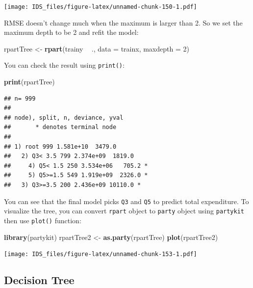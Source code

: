 \documentclass[12pt,]{krantz}
\makeatletter
\newenvironment{Shaded}{\begin{snugshade}}{\end{snugshade}}
\newcommand{\DataTypeTok}[1]{\textcolor[rgb]{0.27,0.27,0.27}{#1}}
\newcommand{\DecValTok}[1]{\textcolor[rgb]{0.06,0.06,0.06}{#1}}
\newcommand{\KeywordTok}[1]{\textcolor[rgb]{0.27,0.27,0.27}{\textbf{#1}}}
\newcommand{\NormalTok}[1]{#1}
\newcommand{\OperatorTok}[1]{\textcolor[rgb]{0.43,0.43,0.43}{\textbf{#1}}}
\newcommand{\StringTok}[1]{\textcolor[rgb]{0.5,0.5,0.5}{#1}}
\newenvironment{kframe}{%
\medskip{}
\setlength{\fboxsep}{.8em}
 \def\at@end@of@kframe{}%
 \ifinner\ifhmode%
  \def\at@end@of@kframe{\end{minipage}}%
  \begin{minipage}{\columnwidth}%
 \fi\fi%
 \def\FrameCommand##1{\hskip\@totalleftmargin \hskip-\fboxsep
 \colorbox{shadecolor}{##1}\hskip-\fboxsep
     \hskip-\linewidth \hskip-\@totalleftmargin \hskip\columnwidth}%
 \MakeFramed {\advance\hsize-\width
   \@totalleftmargin\z@ \linewidth\hsize
   \@setminipage}}%
 {\par\unskip\endMakeFramed%
 \at@end@of@kframe}
\renewenvironment{Shaded}{\begin{kframe}}{\end{kframe}}
\makeatother
\begin{document}
\texttt{[image: IDS\_files/figure-latex/unnamed-chunk-150-1.pdf]}

RMSE doesn't change much when the maximum is larger than 2. So we set the maximum depth to be 2 and refit the model:

\begin{Shaded}
\begin{Highlighting}[]
\NormalTok{rpartTree <-}\StringTok{ }\KeywordTok{rpart}\NormalTok{(trainy }\OperatorTok{~}\StringTok{ }\NormalTok{., }\DataTypeTok{data =}\NormalTok{ trainx, }\DataTypeTok{maxdepth =} \DecValTok{2}\NormalTok{)}
\end{Highlighting}
\end{Shaded}

You can check the result using \texttt{print()}:

\begin{Shaded}
\begin{Highlighting}[]
\KeywordTok{print}\NormalTok{(rpartTree)}
\end{Highlighting}
\end{Shaded}

\begin{verbatim}
## n= 999 
## 
## node), split, n, deviance, yval
##       * denotes terminal node
## 
## 1) root 999 1.581e+10  3479.0  
##   2) Q3< 3.5 799 2.374e+09  1819.0  
##     4) Q5< 1.5 250 3.534e+06   705.2 *
##     5) Q5>=1.5 549 1.919e+09  2326.0 *
##   3) Q3>=3.5 200 2.436e+09 10110.0 *
\end{verbatim}

You can see that the final model picks \texttt{Q3} and \texttt{Q5} to predict total expenditure. To visualize the tree, you can convert \texttt{rpart} object to \texttt{party} object using \texttt{partykit} then use \texttt{plot()} function:

\begin{Shaded}
\begin{Highlighting}[]
\KeywordTok{library}\NormalTok{(partykit)}
\NormalTok{rpartTree2 <-}\StringTok{ }\KeywordTok{as.party}\NormalTok{(rpartTree)}
\KeywordTok{plot}\NormalTok{(rpartTree2)}
\end{Highlighting}
\end{Shaded}

\texttt{[image: IDS\_files/figure-latex/unnamed-chunk-153-1.pdf]}

\hypertarget{decision-tree}{%
\subsection{Decision Tree}\label{decision-tree}}
\end{document}

